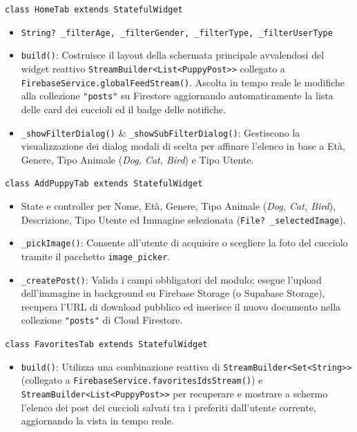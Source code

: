 \documentclass[a4paper]{report}
\begin{document}
\texttt{class HomeTab extends StatefulWidget}
\begin{itemize}
    \item \texttt{String? \_filterAge, \_filterGender, \_filterType, \_filterUserType}
    \item \texttt{build()}: Costruisce il layout della schermata principale avvalendosi del widget reattivo \texttt{StreamBuilder<List<PuppyPost>>} collegato a \texttt{FirebaseService.globalFeedStream()}. Ascolta in tempo reale le modifiche alla collezione \texttt{"posts"} su Firestore aggiornando automaticamente la lista delle card dei cuccioli ed il badge delle notifiche.
    \item \texttt{\_showFilterDialog()} \& \texttt{\_showSubFilterDialog()}: Gestiscono la visualizzazione dei dialog modali di scelta per affinare l'elenco in base a Età, Genere, Tipo Animale (\textit{Dog, Cat, Bird}) e Tipo Utente.
\end{itemize}

\texttt{class AddPuppyTab extends StatefulWidget}
\begin{itemize}
    \item State e controller per Nome, Età, Genere, Tipo Animale (\textit{Dog, Cat, Bird}), Descrizione, Tipo Utente ed Immagine selezionata (\texttt{File? \_selectedImage}).
    \item \texttt{\_pickImage()}: Consente all'utente di acquisire o scegliere la foto del cucciolo tramite il pacchetto \texttt{image\_picker}.
    \item \texttt{\_createPost()}: Valida i campi obbligatori del modulo; esegue l'upload dell'immagine in background su Firebase Storage (o Supabase Storage), recupera l'URL di download pubblico ed inserisce il nuovo documento nella collezione \texttt{"posts"} di Cloud Firestore.
\end{itemize}

\texttt{class FavoritesTab extends StatefulWidget}
\begin{itemize}
    \item \texttt{build()}: Utilizza una combinazione reattiva di \texttt{StreamBuilder<Set<String>>} (collegato a \texttt{FirebaseService.favoritesIdsStream()}) e \texttt{StreamBuilder<List<PuppyPost>>} per recuperare e mostrare a schermo l'elenco dei post dei cuccioli salvati tra i preferiti dall'utente corrente, aggiornando la vista in tempo reale.
\end{itemize}
\end{document}
